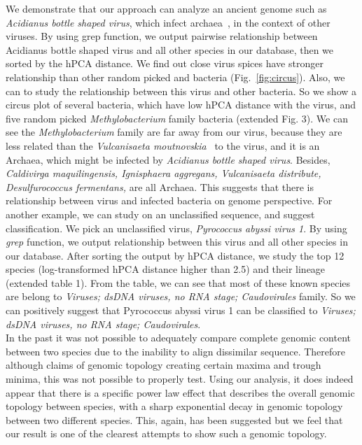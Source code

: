 \documentclass[12pt]{article}
\begin{document}
We demonstrate that our approach can analyze an ancient genome such as \emph{Acidianus bottle shaped virus}, which infect archaea~\cite{Haring:2005aa}, in the context of other viruses. By using grep function, we output pairwise relationship between Acidianus bottle shaped virus and all other species in our database, then we sorted by the hPCA distance. We find out close virus spices have stronger relationship than other random picked and bacteria (Fig.~\ref{fig:circus}). Also, we can to study the relationship between this virus and other bacteria. So we show a circus plot of several bacteria, which have low hPCA distance with the virus, and five random picked \emph{Methylobacterium} family bacteria (extended Fig. 3). We can see the \emph{Methylobacterium} family are far away from our virus, because they are less related than the \emph{Vulcanisaeta moutnovskia}~\cite{Gumerov:2011aa} to the virus, and it is an Archaea, which might be infected by \emph{Acidianus bottle shaped virus}. Besides, \emph{Caldivirga maquilingensis, Ignisphaera aggregans, Vulcanisaeta distribute, Desulfurococcus fermentans,} are all Archaea. This suggests that there is relationship between virus and infected bacteria on genome perspective. For another example, we can study on an unclassified sequence, and suggest classification. We pick an unclassified virus, \emph{Pyrococcus abyssi virus 1}. By using \emph{grep} function, we output relationship between this virus and all other species in our database. After sorting the output by hPCA distance, we study the top 12 species (log-transformed hPCA distance higher than 2.5) and their lineage (extended table 1). From the table, we can see that most of these known species are belong to \emph{Viruses; dsDNA viruses, no RNA stage; Caudovirales} family. So we can positively suggest that Pyrococcus abyssi virus 1 can be classified to \emph{Viruses; dsDNA viruses, no RNA stage; Caudovirales}. \\
In the past it was not possible to adequately compare complete genomic content between two species due to the inability to align dissimilar sequence. Therefore although claims of genomic topology creating certain maxima and trough minima, this was not possible to properly test. Using our analysis, it does indeed appear that there is a specific power law effect that describes the overall genomic topology between species, with a sharp exponential decay in genomic topology between two different species. This, again, has been suggested but we feel that our result is one of the clearest attempts to show such a genomic topology. \\
\end{document}
